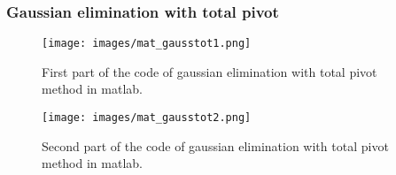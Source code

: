 \documentclass{article}
\begin{document}
\subsubsection{Gaussian elimination with total pivot}
\begin{figure}[ht]
\centering
\texttt{[image: images/mat\_gausstot1.png]}
\caption{\label{fig:py_gausstot}First part of the code of gaussian elimination with total pivot method in matlab.}
\end{figure}
\FloatBarrier
\begin{figure}[ht]
\centering
\texttt{[image: images/mat\_gausstot2.png]}
\caption{\label{fig:py_gausstot}Second part of the code of gaussian elimination with total pivot method in matlab.}
\end{figure}
\FloatBarrier
\end{document}
